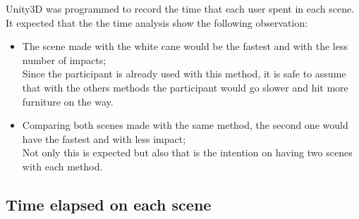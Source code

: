 %
Unity3D was programmed to record the time that each user spent in each scene. It expected that the the time analysis show the following observation:

\begin{itemize}
    \item The scene made with the white cane would be the fastest and with the less number of impacts; \\ 
    Since the participant is already used with this method, it is safe to assume that with the others methods the participant would go slower and hit more furniture on the way.
    \item Comparing both scenes made with the same method, the second one would have the fastest and with less impact; \\
    Not only this is expected but also that is the intention on having two scenes with each method.
\end{itemize}

\subsection{Time elapsed on each scene}
\label{subsec:results_collsions}



